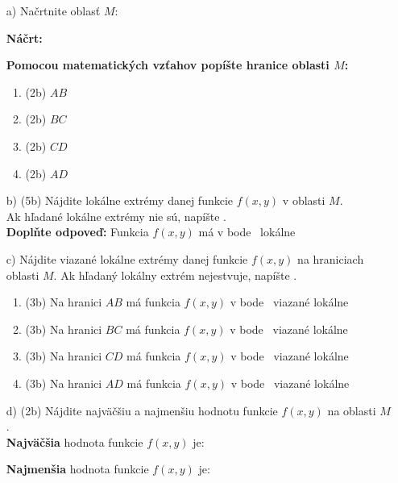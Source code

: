\documentclass[12pt]{article}
\newcommand{\gr}{\dotfill \ }
\begin{document}
\begin{enumerate}
\item[a)] Načrtnite oblasť $M$:

\textbf{Náčrt:}
\vspace{5cm}

\textbf{Pomocou matematických vzťahov popíšte hranice oblasti $M$:}
\begin{enumerate}
\item (2b) $AB$ \gr
\item (2b) $BC$ \gr
\item (2b) $CD$ \gr
\item (2b) $AD$ \gr
\end{enumerate}

\item[b)](5b) Nájdite lokálne extrémy danej funkcie $f(x, y)$ v oblasti $M$. \\
Ak hľadané lokálne extrémy nie sú, napíšte .\\[1ex]
\hspace{5cm} \textbf{Doplňte odpoveď:}
Funkcia $f(x,y)$ má v bode \gr lokálne \gr
\medskip

\item[c)] Nájdite viazané lokálne extrémy danej funkcie $f(x, y)$ na hraniciach oblasti $M$.
Ak hľadaný lokálny extrém nejestvuje, napíšte .

\begin{enumerate}
\item (3b) Na hranici $AB$ má funkcia $f(x,y)$  v bode \gr viazané lokálne \gr
\item (3b) Na hranici $BC$ má funkcia $f(x,y)$  v bode \gr viazané lokálne \gr
\item (3b) Na hranici $CD$ má funkcia $f(x,y)$  v bode \gr viazané lokálne \gr
\item (3b) Na hranici $AD$ má funkcia $f(x,y)$  v bode \gr viazané lokálne \gr
\end{enumerate}
\item[d)] (2b) Nájdite najväčšiu a najmenšiu hodnotu funkcie $f(x,y)$ na oblasti $M$.\\

\textbf{Najväčšia} hodnota funkcie $f(x,y)$ je: \gr

\textbf{Najmenšia} hodnota funkcie $f(x,y)$ je: \gr

\end{enumerate}
\end{document}
